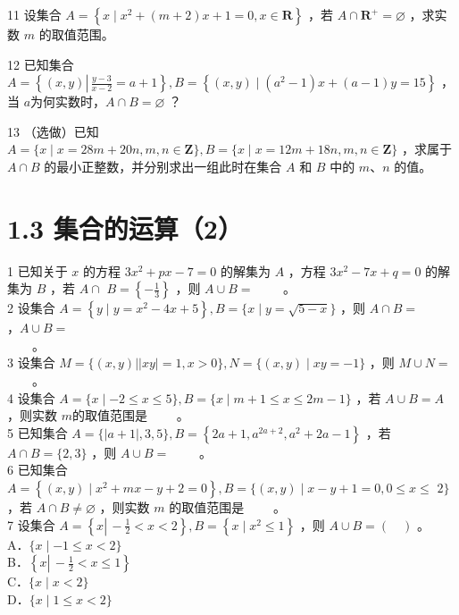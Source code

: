 \documentclass[10pt]{article}
\begin{document}
11 设集合 \(A=\left\{x \mid x^{2}+(m+2) x+1=0, x \in \mathbf{R}\right\}\) ，若 \(A \cap \mathbf{R}^{+}=\varnothing\) ，求实数 \(m\) 的取值范围。

12 已知集合 \(A=\left\{(x, y) \left\lvert\, \frac{y-3}{x-2}=a+1\right.\right\}, B=\left\{(x, y) \mid\left(a^{2}-1\right) x+(a-1) y=15\right\}\) ，当 \(a\)为何实数时，\(A \cap B=\varnothing\) ？

13 （选做）已知 \(A=\{x \mid x=28 m+20 n, m, n \in \mathbf{Z}\}, B=\{x \mid x=12 m+18 n, m, n \in \mathbf{Z}\}\) ，求属于 \(A \cap B\) 的最小正整数，并分别求出一组此时在集合 \(A\) 和 \(B\) 中的 \(m 、 n\) 的值。

\section*{1.3 集合的运算（2）}
1 已知关于 \(x\) 的方程 \(3 x^{2}+p x-7=0\) 的解集为 \(A\) ，方程 \(3 x^{2}-7 x+q=0\) 的解集为 \(B\) ，若 \(A \cap\) \(B=\left\{-\frac{1}{3}\right\}\) ，则 \(A \cup B=\) \(\qquad\)。\\
2 设集合 \(A=\left\{y \mid y=x^{2}-4 x+5\right\}, B=\{x \mid y=\sqrt{5-x}\}\) ，则 \(A \cap B=\) \(\qquad\) ，\(A \cup B=\)\\
\(\qquad\)。\\
3 设集合 \(M=\{(x, y)| | x y \mid=1, x>0\}, N=\{(x, y) \mid x y=-1\}\) ，则 \(M \cup N=\)\\
\(\qquad\)。\\
4 设集合 \(A=\{x \mid-2 \leqslant x \leqslant 5\}, B=\{x \mid m+1 \leqslant x \leqslant 2 m-1\}\) ，若 \(A \cup B=A\) ，则实数 \(m\)的取值范围是 \(\qquad\)。\\
5 已知集合 \(A=\{|a+1|, 3,5\}, B=\left\{2 a+1, a^{2 a+2}, a^{2}+2 a-1\right\}\) ，若 \(A \cap B=\{2,3\}\) ，则 \(A \cup B=\) \(\qquad\)。\\
6 已知集合 \(A=\left\{(x, y) \mid x^{2}+m x-y+2=0\right\}, B=\{(x, y) \mid x-y+1=0,0 \leqslant x \leqslant\) \(2\}\) ，若 \(A \cap B \neq \varnothing\) ，则实数 \(m\) 的取值范围是 \(\qquad\)。\\
7 设集合 \(A=\left\{x \left\lvert\,-\frac{1}{2}<x<2\right.\right\}, B=\left\{x \mid x^{2} \leqslant 1\right\}\) ，则 \(A \cup B=(\quad)\) 。\\
A．\(\{x \mid-1 \leqslant x<2\}\)\\
B．\(\left\{x \left\lvert\,-\frac{1}{2}<x \leqslant 1\right.\right\}\)\\
C．\(\{x \mid x<2\}\)\\
D．\(\{x \mid 1 \leqslant x<2\}\)
\end{document}
